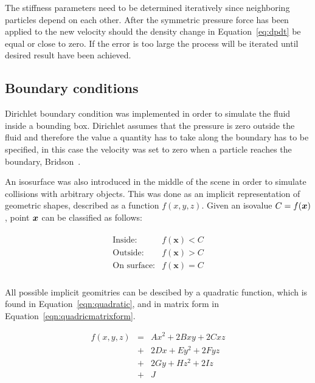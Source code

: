     The stiffness parameters need to be determined iteratively since neighboring particles depend on each other.
    After the symmetric pressure force has been applied to the new velocity should the density change in Equation~\ref{eq:dpdt} be equal or close to zero.
    If the error is too large the process will be iterated until desired result have been achieved.


\subsection{Boundary conditions}
Dirichlet boundary condition was implemented in order to simulate the fluid inside a bounding box.
Dirichlet assumes that the pressure is zero outside the fluid and therefore the value a quantity has to take along the boundary has to be specified, in this case the velocity was set to zero when a particle reaches the boundary, Bridson~\cite{bridson}.

An isosurface was also introduced in the middle of the scene in order to simulate collisions with arbitrary objects.
This was done as an implicit representation of geometric shapes, described as a function $f(x,y,z)$.
Given an isovalue $C = f(\bm{x})$, point $\bm{x}$ can be classified as follows:

\begin{eqnarray} \label{eq:classifications}
\begin{array}{ll}
 \mbox{Inside:} & f(\mathbf{x}) < C \\
 \mbox{Outside:} & f(\mathbf{x}) > C \\
 \mbox{On surface:} & f(\mathbf{x}) = C \\  
  \end{array}
\end{eqnarray}

All possible implicit geomitries can be descibed by a quadratic function, which is found in Equation~\ref{eqn:quadratic}, and in matrix form in Equation~\ref{eqn:quadricmatrixform}.

\begin{eqnarray}
\label{eqn:quadratic}
f(x,y,z) &=
\nonumber & Ax^2+2Bxy+2Cxz\\
 &+&2Dx+Ey^2+2Fyz\\
\nonumber &+&2Gy+Hz^2+2Iz\\
\nonumber &+&J
\end{eqnarray}

